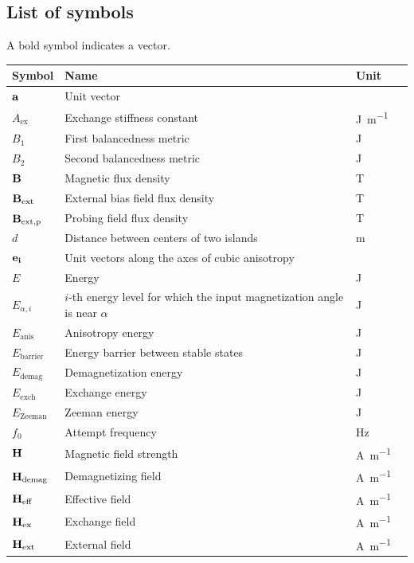 \documentclass[11pt,a4paper,english,twoside]{article}
\begin{document}
\subsection*{List of symbols}
A bold symbol indicates a vector.
\begin{longtable}{llll}
\toprule
\bfseries Symbol & \bfseries Name &
\bfseries Unit \\\midrule\endhead
$\vb{a}$ & Unit vector & \\
$A_\mathrm{ex}$ & Exchange stiffness constant & \si{\joule\per\metre} \\
$B_1$ & First balancedness metric & \si{\joule} \\
$B_2$ & Second balancedness metric & \si{\joule} \\
$\vb{B}$ & Magnetic flux density & \si{\tesla} \\
$\vb{B_\mathrm{ext}}$ & External bias field flux density & \si{\tesla} \\
$\vb{B_\mathrm{ext,p}}$ & Probing field flux density & \si{\tesla} \\
$d$ & Distance between centers of two islands & \si{\metre} \\
$\vb{e_i}$ & Unit vectors along the axes of cubic anisotropy &  \\
$E$ & Energy & \si{\joule} \\
$E_{\alpha,i}$ & $i$-th energy level for which the input magnetization angle is near $\alpha$ & \si{\joule} \\ 
$E_\mathrm{anis}$ & Anisotropy energy & \si{\joule} \\
$E_\mathrm{barrier}$ & Energy barrier between stable states & \si{\joule} \\
$E_\mathrm{demag}$ & Demagnetization energy & \si{\joule} \\
$E_\mathrm{exch}$ & Exchange energy & \si{\joule} \\
$E_\mathrm{Zeeman}$ & Zeeman energy & \si{\joule} \\
$f_0$ & Attempt frequency & \si{\hertz} \\
$\vb{H}$ & Magnetic field strength & \si{\ampere\per\metre} \\
$\vb{H_\mathrm{demag}}$ & Demagnetizing field & \si{\ampere\per\metre} \\
$\vb{H_\mathrm{eff}}$ & Effective field & \si{\ampere\per\metre} \\
$\vb{H_\mathrm{ex}}$ & Exchange field & \si{\ampere\per\metre} \\
$\vb{H_\mathrm{ext}}$ & External field & \si{\ampere\per\metre} \\

\end{longtable}
\end{document}

